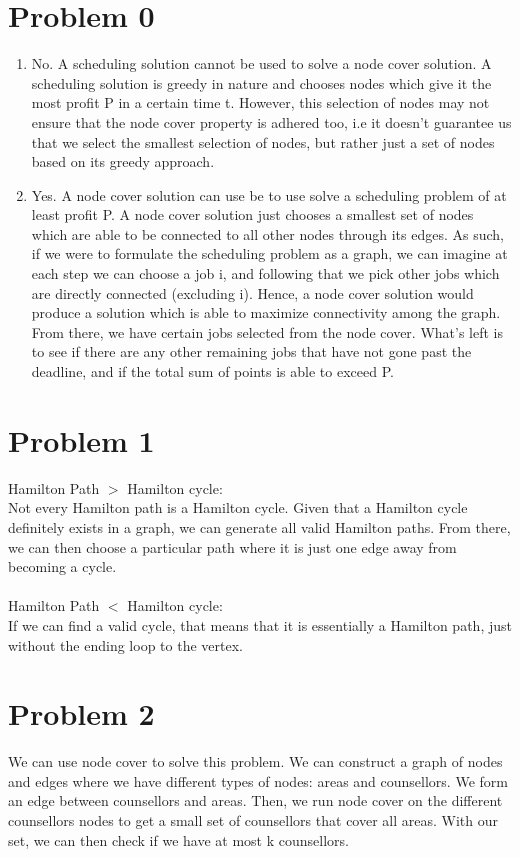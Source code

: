 \documentclass[12pt,letterpaper]{article}
\begin{document}
\section*{Problem 0}
\begin{enumerate}
  \item
    No.
    A scheduling solution cannot be used to solve a node cover solution. 
    A scheduling solution is greedy in nature and chooses nodes which give it the most profit P
    in a certain time t.
    However, this selection of nodes may not ensure that the node cover property is adhered too,
    i.e it doesn't guarantee us that we select the smallest selection of nodes,
    but rather just a set of nodes based on its greedy approach. 
  \item
    Yes.
    A node cover solution can use be to use solve a scheduling problem of at least profit P.
    A node cover solution just chooses a smallest set of nodes which are able to be connected to all other nodes through its edges.
    As such, if we were to formulate the scheduling problem as a graph, 
    we can imagine at each step we can choose a job i, and following that we pick other jobs which are directly connected (excluding i).
    Hence, a node cover solution would produce a solution which is able to maximize connectivity among the graph.
    From there, we have certain jobs selected from the node cover.
    What's left is to see if there are any other remaining jobs that have not gone past the deadline, 
    and if the total sum of points is able to exceed P.
\end{enumerate}

\section*{Problem 1}
Hamilton Path $>$ Hamilton cycle: \\
Not every Hamilton path is a Hamilton cycle. 
Given that a Hamilton cycle definitely exists in a graph, 
we can generate all valid Hamilton paths.
From there, we can then choose a particular path where it is just one edge away from becoming a cycle. \\\\
Hamilton Path $<$ Hamilton cycle: \\
If we can find a valid cycle, that means that it is essentially a Hamilton path,
just without the ending loop to the vertex.

\section*{Problem 2}
We can use node cover to solve this problem.
We can construct a graph of nodes and edges where we have different types of nodes: areas and counsellors.
We form an edge between counsellors and areas.
Then, we run node cover on the different counsellors nodes to get a small
set of counsellors that cover all areas.
With our set, we can then check if we have at most k counsellors.
\end{document}
